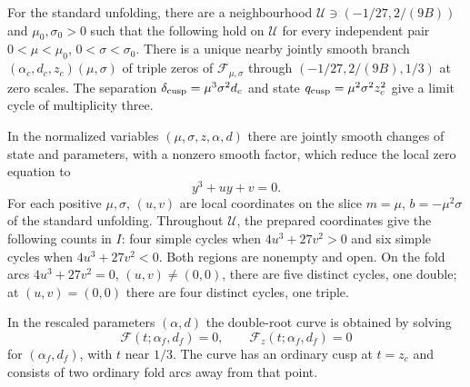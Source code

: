 \begin{theorem}\label{thm:actual-cusp}
For the standard unfolding, there are a neighbourhood
$\mathcal U\ni(-1/27,2/(9B))$ and $\mu_0,\sigma_0>0$
such that the following hold on $\mathcal U$ for every independent pair
$0<\mu<\mu_0$, $0<\sigma<\sigma_0$. There is a unique nearby
jointly smooth branch $(\alpha_c,d_c,z_c)(\mu,\sigma)$ of triple zeros
of $\mathcal F_{\mu,\sigma}$ through
$(-1/27,2/(9B),1/3)$ at zero scales.
The separation $\delta_{\rm cusp}=\mu^3\sigma^2d_c$ and
state $q_{\rm cusp}=\mu^2\sigma^2z_c^2$ give a limit cycle of multiplicity
three.

In the normalized variables $(\mu,\sigma,z,\alpha,d)$ there are jointly
smooth changes of state and parameters, with a nonzero smooth factor, which
reduce the local zero equation to
\begin{equation}\label{corner:cusp-preparation}
 y^3+uy+v=0.
\end{equation}
For each positive $\mu,\sigma$, $(u,v)$ are local coordinates on the slice
$m=\mu$, $b=-\mu^2\sigma$ of the standard unfolding. Throughout $\mathcal U$,
the prepared coordinates give the following counts in $I$:
four simple cycles when $4u^3+27v^2>0$ and six simple cycles when
$4u^3+27v^2<0$. Both regions are nonempty and open. On the fold arcs
$4u^3+27v^2=0$, $(u,v)\ne(0,0)$, there are five distinct cycles,
one double; at $(u,v)=(0,0)$ there are four distinct cycles, one triple.

In the rescaled parameters $(\alpha,d)$ the double-root curve is obtained
by solving
\begin{equation}\label{corner:actual-fold-curve}
 \mathcal F(t;\alpha_f,d_f)=0,\qquad
 \mathcal F_z(t;\alpha_f,d_f)=0
\end{equation}
for $(\alpha_f,d_f)$, with $t$ near $1/3$.
The curve has an ordinary cusp at $t=z_c$ and consists
of two ordinary fold arcs away from that point.
\end{theorem}

